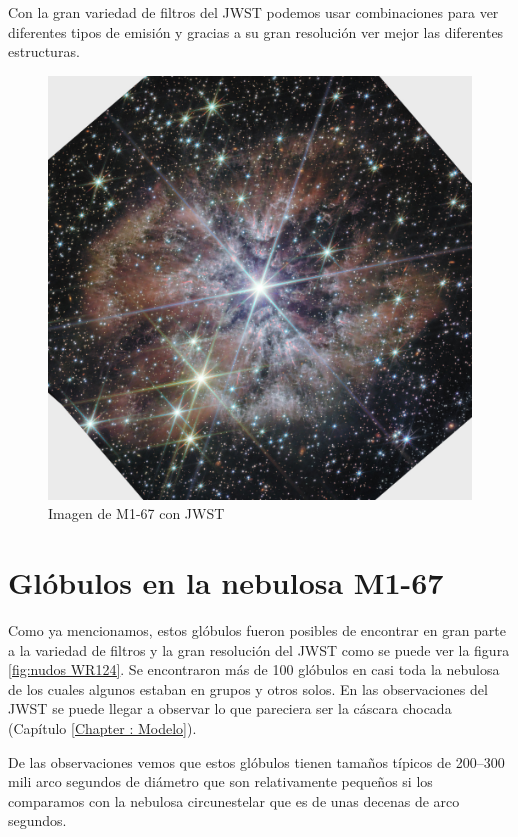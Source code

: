 \documentclass{book}
\begin{document}
Con la gran variedad de filtros del JWST podemos usar combinaciones para ver diferentes tipos de emisión y gracias a su gran resolución ver mejor las diferentes estructuras.

\begin{figure}[htb]
    \centering
    \includegraphics[width=\textwidth]{M1-67-JWST.jpg}
    \caption{Imagen de M1-67 con JWST}
    \label{fig:M1-67JWST}
\end{figure}

\section{Glóbulos en la nebulosa M1-67}

Como ya mencionamos, estos glóbulos fueron posibles de encontrar en gran parte a la variedad de filtros y la gran resolución del JWST como se puede ver la figura \ref{fig:nudos WR124}. Se encontraron más de 100 glóbulos en casi toda la nebulosa de los cuales algunos estaban en grupos y otros solos. En las observaciones del JWST se puede llegar a observar lo que pareciera ser la cáscara chocada (Capítulo \ref{Chapter : Modelo}).

De las observaciones vemos que estos glóbulos tienen tamaños típicos de 200--300 mili arco segundos de diámetro que son relativamente pequeños si los comparamos con la nebulosa circunestelar que es de unas decenas de arco segundos.
\end{document}
